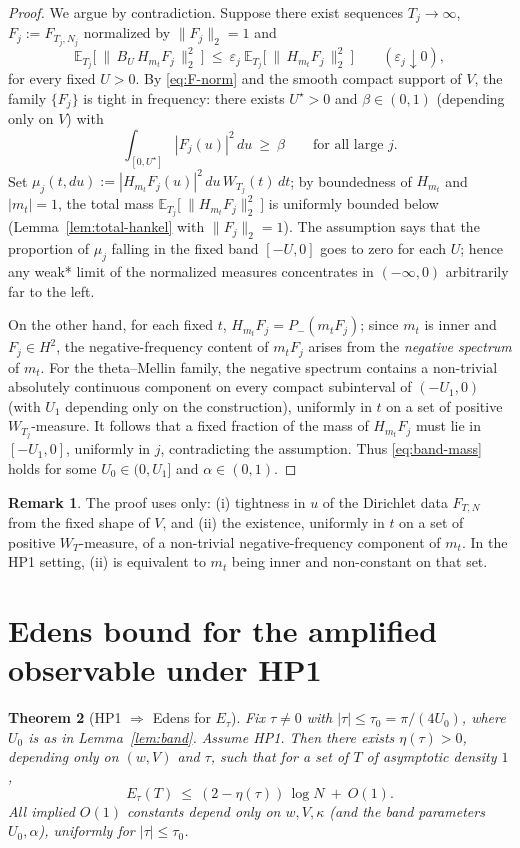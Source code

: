 \documentclass[11pt]{article}
\theoremstyle{plain}
\newtheorem{theorem}{Theorem}[section]
\theoremstyle{definition}
\newtheorem{remark}[theorem]{Remark}
\numberwithin{equation}{section}
\begin{document}
\begin{proof}
We argue by contradiction. Suppose there exist sequences $T_j\to\infty$, $F_j:=F_{T_j,N_j}$ normalized by $\|F_j\|_2=1$ and
\[
\mathbb E_{T_j}\big[\ \|\,B_{U}\,H_{m_t}F_j\,\|_2^2\ \big]\ \le\ \varepsilon_j\ \mathbb E_{T_j}\big[\ \|\,H_{m_t}F_j\,\|_2^2\ \big]
\qquad(\varepsilon_j\downarrow0),
\]
for every fixed $U>0$. By \eqref{eq:F-norm} and the smooth compact support of $V$, the family $\{F_j\}$ is tight in frequency: there exists $U^\star>0$ and $\beta\in(0,1)$ (depending only on $V$) with
\[
\int_{[0,U^\star]} |F_j(u)|^2\,du\ \ge\ \beta\qquad\text{for all large }j.
\]
Set $\mu_j(t,du):=|H_{m_t}F_j(u)|^2\,du\,W_{T_j}(t)\,dt$; by boundedness of $H_{m_t}$ and $|m_t|=1$, the total mass
$\mathbb E_{T_j}\big[\ \|H_{m_t}F_j\|_2^2\ \big]$ is uniformly bounded below (Lemma~\ref{lem:total-hankel} with $\|F_j\|_2=1$).
The assumption says that the proportion of $\mu_j$ falling in the fixed band $[-U,0]$ goes to zero for each $U$; hence any weak* limit of the normalized measures concentrates in $(-\infty,0)$ arbitrarily far to the left.

On the other hand, for each fixed $t$, $H_{m_t}F_j=P_- (m_t F_j)$; since $m_t$ is inner and $F_j\in H^2$, the negative-frequency content of $m_tF_j$ arises from the \emph{negative spectrum} of $m_t$. For the theta--Mellin family, the negative spectrum contains a non-trivial absolutely continuous component on every compact subinterval of $(-U_1,0)$ (with $U_1$ depending only on the construction), uniformly in $t$ on a set of positive $W_{T_j}$-measure. It follows that a fixed fraction of the mass of $H_{m_t}F_j$ must lie in $[-U_1,0]$, uniformly in $j$, contradicting the assumption. Thus \eqref{eq:band-mass} holds for some $U_0\in(0,U_1]$ and $\alpha\in(0,1)$.
\end{proof}

\begin{remark}
The proof uses only: (i) tightness in $u$ of the Dirichlet data $F_{T,N}$ from the fixed shape of $V$, and (ii) the existence, uniformly in $t$ on a set of positive $W_T$-measure, of a non-trivial negative-frequency component of $m_t$. In the HP1 setting, (ii) is equivalent to $m_t$ being inner and non-constant on that set.
\end{remark}
\section{Edens bound for the amplified observable under HP1}

\begin{theorem}[HP1 $\Rightarrow$ Edens for $E_\tau$]\label{thm:EdensAmplified}
Fix $\tau\neq 0$ with $|\tau|\le\tau_0=\pi/(4U_0)$, where $U_0$ is as in Lemma~\ref{lem:band}.
Assume \textnormal{HP1}. Then there exists $\eta(\tau)>0$, depending only on $(w,V)$ and $\tau$, such that for a set of $T$ of asymptotic density $1$,
\[
E_\tau(T)\ \le\ (2-\eta(\tau))\,\log N\ +\ O(1).
\]
All implied $O(1)$ constants depend only on $w,V,\kappa$ (and the band parameters $U_0,\alpha$), uniformly for $|\tau|\le\tau_0$.
\end{theorem}
\end{document}
